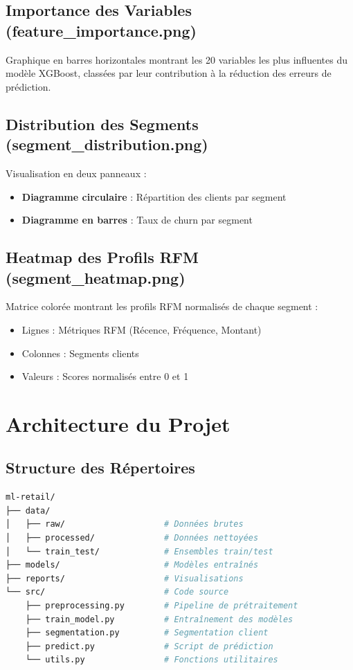 \documentclass[11pt,a4paper]{article}
\begin{document}
\subsection{Importance des Variables (feature\_importance.png)}

Graphique en barres horizontales montrant les 20 variables les plus influentes du modèle XGBoost, classées par leur contribution à la réduction des erreurs de prédiction.

\subsection{Distribution des Segments (segment\_distribution.png)}

Visualisation en deux panneaux :
\begin{itemize}
    \item \textbf{Diagramme circulaire} : Répartition des clients par segment
    \item \textbf{Diagramme en barres} : Taux de churn par segment
\end{itemize}

\subsection{Heatmap des Profils RFM (segment\_heatmap.png)}

Matrice colorée montrant les profils RFM normalisés de chaque segment :
\begin{itemize}
    \item Lignes : Métriques RFM (Récence, Fréquence, Montant)
    \item Colonnes : Segments clients
    \item Valeurs : Scores normalisés entre 0 et 1
\end{itemize}

\section{Architecture du Projet}

\subsection{Structure des Répertoires}

\begin{lstlisting}[language=bash]
ml-retail/
├── data/
│   ├── raw/                    # Données brutes
│   ├── processed/              # Données nettoyées
│   └── train_test/             # Ensembles train/test
├── models/                     # Modèles entraînés
├── reports/                    # Visualisations
└── src/                        # Code source
    ├── preprocessing.py        # Pipeline de prétraitement
    ├── train_model.py          # Entraînement des modèles
    ├── segmentation.py         # Segmentation client
    ├── predict.py              # Script de prédiction
    └── utils.py                # Fonctions utilitaires
\end{lstlisting}
\end{document}
